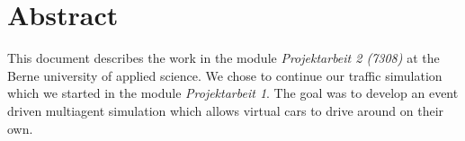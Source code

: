 
\section{Abstract}

This document describes the work in the module \emph{Projektarbeit 2 (7308)}
at the Berne university of applied science. We chose to continue our traffic simulation
 which we started in the module \emph{Projektarbeit 1}. The goal
was to develop an event driven multiagent simulation which allows virtual cars to drive around on their own.
